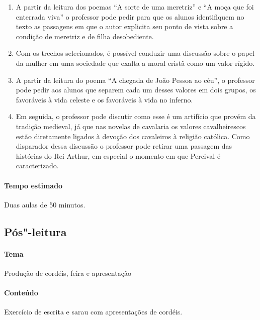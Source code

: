 \documentclass[12pt]{extarticle}
\begin{document}
\begin{enumerate}

\item A partir da leitura dos poemas ``A sorte de uma meretriz'' e ``A moça que
  foi enterrada viva'' o professor pode pedir para que os alunos identifiquem
  no texto as passagens em que o autor explicita seu ponto de vista sobre
  a condição de meretriz e de filha desobediente. 

\item Com os trechos selecionados, é possível conduzir uma discussão sobre
  o papel da mulher em uma sociedade que exalta a moral cristã como um valor
  rígido.

\item A partir da leitura do poema ``A chegada de João Pessoa ao céu'',
  o professor pode pedir aos alunos que separem cada um desses valores em dois
  grupos, os favoráveis à vida celeste e os favoráveis à vida no inferno. 

\item Em seguida, o professor pode discutir como esse é um artifício que provém
  da tradição medieval, já que nas novelas de cavalaria os valores
  cavalheirescos estão diretamente ligados à devoção dos cavaleiros à religião
  católica.  Como disparador dessa discussão o professor pode retirar uma
  passagem das histórias do Rei Arthur, em especial o momento em que Percival
  é caracterizado.

\end{enumerate}

\paragraph{Tempo estimado} Duas aulas de 50 minutos.

\subsection{Pós"-leitura}

\paragraph{Tema} Produção de cordéis, feira e apresentação

\paragraph{Conteúdo} Exercício de escrita e sarau com apresentações de cordéis.
\end{document}
